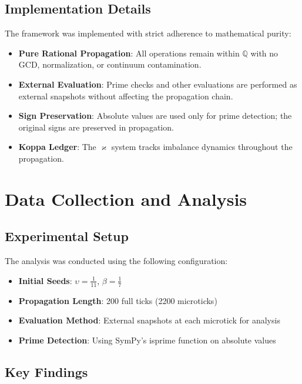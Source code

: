 \documentclass[12pt]{article}
\begin{document}
\subsection{Implementation Details}

The framework was implemented with strict adherence to mathematical purity:

\begin{itemize}
\item \textbf{Pure Rational Propagation}: All operations remain within $\mathbb{Q}$ with no GCD, normalization, or continuum contamination.

\item \textbf{External Evaluation}: Prime checks and other evaluations are performed as external snapshots without affecting the propagation chain.

\item \textbf{Sign Preservation}: Absolute values are used only for prime detection; the original signs are preserved in propagation.

\item \textbf{Koppa Ledger}: The $\varkappa$ system tracks imbalance dynamics throughout the propagation.
\end{itemize}

\section{Data Collection and Analysis}

\subsection{Experimental Setup}

The analysis was conducted using the following configuration:

\begin{itemize}
\item \textbf{Initial Seeds}: $\upsilon = \frac{1}{11}$, $\beta = \frac{1}{7}$
\item \textbf{Propagation Length}: 200 full ticks (2200 microticks)
\item \textbf{Evaluation Method}: External snapshots at each microtick for analysis
\item \textbf{Prime Detection}: Using SymPy's isprime function on absolute values
\end{itemize}

\subsection{Key Findings}
\end{document}

